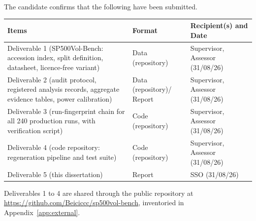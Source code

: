 \frontcover
\setcounter{page}{2}
\clearpage
{}
\noindent The candidate confirms that the following have been submitted.\\[4mm]
\begin{center}
\begin{tabular}{|p{52mm}|p{38mm}|p{52mm}|}
\hline
\textbf{Items} & \textbf{Format} & \textbf{Recipient(s) and Date} \\\hline
Deliverable 1 (SP500Vol-Bench: accession index, split definition, datasheet, licence-free variant) & Data (repository) & Supervisor, Assessor (31/08/26) \\\hline
Deliverable 2 (audit protocol, registered analysis records, aggregate evidence tables, power calibration) & Data (repository)\newline / Report & Supervisor, Assessor (31/08/26) \\\hline
Deliverable 3 (run-fingerprint chain for all 240 production runs, with verification script) & Code (repository) & Supervisor, Assessor (31/08/26) \\\hline
Deliverable 4 (code repository: regeneration pipeline and test suite) & Code (repository) & Supervisor, Assessor (31/08/26) \\\hline
Deliverable 5 (this dissertation) & Report & SSO (31/08/26) \\\hline
\end{tabular}
\end{center}
\vspace{3mm}
\noindent Deliverables 1 to 4 are shared through the public repository at
\url{https://github.com/Beiciccc/sp500vol-bench}, inventoried in
Appendix~\ref{app:external}.
\vspace{5mm}

